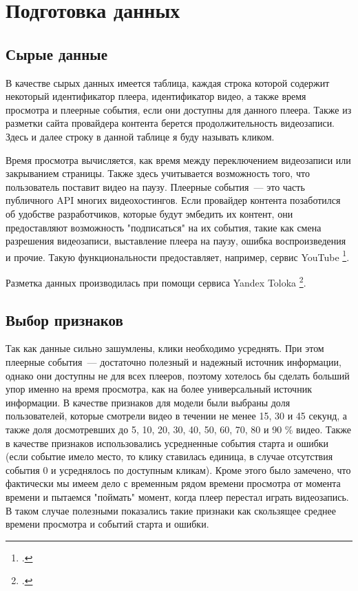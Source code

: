 \chapter{Подготовка данных}

\section{Сырые данные}

В качестве сырых данных имеется таблица, каждая строка которой содержит некоторый идентификатор плеера, идентификатор видео, а также время просмотра и плеерные события, если они доступны для данного плеера. Также из разметки сайта провайдера контента берется продолжительность видеозаписи. Здесь и далее строку в данной таблице я буду называть кликом.

Время просмотра вычисляется, как время между переключением видеозаписи или закрыванием страницы. Также здесь учитывается возможность того, что пользователь поставит видео на паузу. Плеерные события~--- это часть публичного API многих видеохостингов. Если провайдер контента позаботился об удобстве разработчиков, которые будут эмбедить их контент, они предоставляют возможность "подписаться" на их события, такие как смена разрешения видеозаписи, выставление плеера на паузу, ошибка воспроизведения и прочие. Такую функциональности предоставляет, например, сервис YouTube \footcite{YouTubeAPI}.

Разметка данных производилась при помощи сервиса Yandex Toloka \footcite{Toloka}.

\section{Выбор признаков}

Так как данные сильно зашумлены, клики необходимо усреднять. При этом плеерные события~--- достаточно полезный и надежный источник информации, однако они доступны не для всех плееров, поэтому хотелось бы сделать больший упор именно на время просмотра, как на более универсальный источник информации. В качестве признаков для модели были выбраны доля пользователей, которые смотрели видео в течении не менее 15, 30 и 45 секунд, а также доля досмотревших до 5, 10, 20, 30, 40, 50, 60, 70, 80 и 90 \% видео. Также в качестве признаков использовались усредненные события старта и ошибки (если событие имело место, то клику ставилась единица, в случае отсутствия события 0 и усреднялось по доступным кликам). Кроме этого было замечено, что фактически мы имеем дело с временным рядом времени просмотра от момента времени и пытаемся "поймать" момент, когда плеер перестал играть видеозапись. В таком случае полезными показались такие признаки как скользящее среднее времени просмотра и событий старта и ошибки.